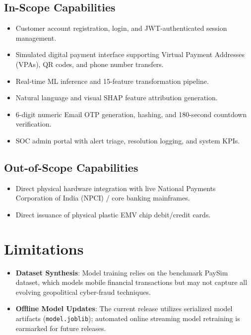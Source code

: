 \subsection{In-Scope Capabilities}
\begin{itemize}
    \item Customer account registration, login, and JWT-authenticated session management.
    \item Simulated digital payment interface supporting Virtual Payment Addresses (VPAs), QR codes, and phone number transfers.
    \item Real-time ML inference and 15-feature transformation pipeline.
    \item Natural language and visual SHAP feature attribution generation.
    \item 6-digit numeric Email OTP generation, hashing, and 180-second countdown verification.
    \item SOC admin portal with alert triage, resolution logging, and system KPIs.
\end{itemize}

\subsection{Out-of-Scope Capabilities}
\begin{itemize}
    \item Direct physical hardware integration with live National Payments Corporation of India (NPCI) / core banking mainframes.
    \item Direct issuance of physical plastic EMV chip debit/credit cards.
\end{itemize}

\section{Limitations}
\begin{itemize}
    \item \textbf{Dataset Synthesis}: Model training relies on the benchmark PaySim dataset, which models mobile financial transactions but may not capture all evolving geopolitical cyber-fraud techniques.
    \item \textbf{Offline Model Updates}: The current release utilizes serialized model artifacts (\texttt{model.joblib}); automated online streaming model retraining is earmarked for future releases.
\end{itemize}
